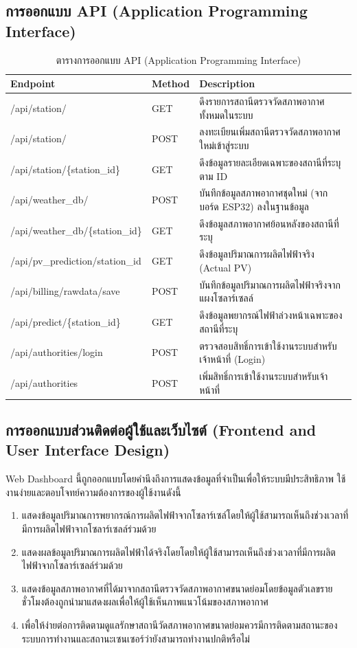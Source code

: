 \subsection{การออกแบบ API (Application Programming Interface)}
\begin{table}[H]
    \begin{tabular}{|l|l|l|}
    \hline
    \textbf{Endpoint} & \textbf{Method} & \textbf{Description} \\ \hline
    /api/station/ & GET & ดึงรายการสถานีตรวจวัดสภาพอากาศทั้งหมดในระบบ\\ \hline
    /api/station/ & POST & ลงทะเบียนเพิ่มสถานีตรวจวัดสภาพอากาศใหม่เข้าสู่ระบบ\\ \hline
    /api/station/\{station\_id\} &  GET & ดึงข้อมูลรายละเอียดเฉพาะของสถานีที่ระบุตาม ID\\ \hline
    /api/weather\_db/ & POST & บันทึกข้อมูลสภาพอากาศชุดใหม่ (จากบอร์ด ESP32) ลงในฐานข้อมูล\\ \hline
    /api/weather\_db/\{station\_id\} & GET & ดึงข้อมูลสภาพอากาศย้อนหลังของสถานีที่ระบุ\\ \hline
    /api/pv\_prediction/{station\_id} & GET & ดึงข้อมูลปริมาณการผลิตไฟฟ้าจริง (Actual PV)\\
    /api/billing/raw\-data/save & POST & บันทึกข้อมูลปริมาณการผลิตไฟฟ้าจริงจากแผงโซลาร์เซลล์\\ \hline
    /api/predict/\{station\_id\} & GET & ดึงข้อมูลพยากรณ์ไฟฟ้าล่วงหน้าเฉพาะของสถานีที่ระบุ\\ \hline
    /api/authorities/login & POST & ตรวจสอบสิทธิ์การเข้าใช้งานระบบสำหรับเจ้าหน้าที่ (Login)\\ \hline
    /api/authorities & POST & เพิ่มสิทธิ์การเข้าใช้งานระบบสำหรับเจ้าหน้าที่\\ \hline
    \end{tabular}
    \caption{ตารางการออกแบบ API (Application Programming Interface)}
\end{table}


\subsection{การออกแบบส่วนติดต่อผู้ใช้และเว็บไซต์ (Frontend and User Interface Design)}

\hspace{\parindent}Web Dashboard นี้ถูกออกแบบโดยคำนึงถึงการแสดงข้อมูลที่จำเป็นเพื่อให้ระบบมีประสิทธิภาพ ใช้งานง่ายและตอบโจทย์ความต้องการของผู้ใช้งานดังนี้
\begin{enumerate}
    \item แสดงข้อมูลปริมาณการพยากรณ์การผลิตไฟฟ้าจากโซลาร์เซล์โดยให้ผู้ใช้สามารถเห็นถึงช่วงเวลาที่มีการผลิตไฟฟ้าจากโซลาร์เซลล์ร่วมด้วย
    \item แสดงผลข้อมูลปริมาณการผลิตไฟฟ้าได้จริงโดยโดยให้ผู้ใช้สามารถเห็นถึงช่วงเวลาที่มีการผลิตไฟฟ้าจากโซลาร์เซลล์ร่วมด้วย
    \item  แสดงข้อมูลสภาพอากาศที่ได้มาจากสถานีตรวจวัดสภาพอากาศขนาดย่อมโดยข้อมูลตัวเลขรายชั่วโมงต้องถูกนำมาแสดงผลเพื่อให้ผู้ใช้เห็นภาพแนวโน้มของสภาพอากาศ
    \item เพื่อให้ง่ายต่อการติดตามดูแลรักษาสถานีวัดสภาพอากาศขนาดย่อมควรมีการติดตามสถานะของระบบการทำงานและสถานะเซนเซอร์ว่ายังสามารถทำงานปกติหรือไม่
\end{enumerate}


